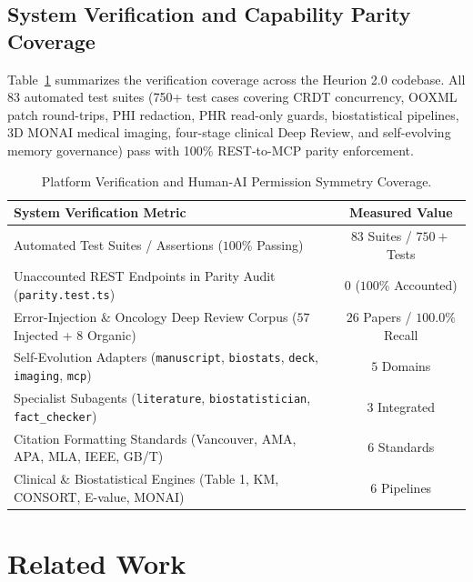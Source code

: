 \documentclass[11pt,a4paper]{article}
\begin{document}
\subsection{System Verification and Capability Parity Coverage}
Table~\ref{tab:system_verification} summarizes the verification coverage across the Heurion 2.0 codebase. All 83 automated test suites (750+ test cases covering CRDT concurrency, OOXML patch round-trips, PHI redaction, PHR read-only guards, biostatistical pipelines, 3D MONAI medical imaging, four-stage clinical Deep Review, and self-evolving memory governance) pass with 100\% REST-to-MCP parity enforcement.

\begin{table}[!t]
\centering
\caption{Platform Verification and Human-AI Permission Symmetry Coverage.}
\label{tab:system_verification}
\vspace{2pt}
\small
\setlength{\tabcolsep}{0pt}
\begin{tabular*}{\textwidth}{@{\extracolsep{\fill}}lc@{}}
\toprule
\textbf{System Verification Metric} & \textbf{Measured Value} \\
\midrule
Automated Test Suites / Assertions ($100\%$ Passing) & $83$ Suites / $750+$ Tests \\
Unaccounted REST Endpoints in Parity Audit (\texttt{parity.test.ts}) & $0$ ($100\%$ Accounted) \\
Error-Injection \& Oncology Deep Review Corpus ($57$ Injected + $8$ Organic) & $26$ Papers / $100.0\%$ Recall \\
Self-Evolution Adapters (\texttt{manuscript}, \texttt{biostats}, \texttt{deck}, \texttt{imaging}, \texttt{mcp}) & $5$ Domains \\
Specialist Subagents (\texttt{literature}, \texttt{biostatistician}, \texttt{fact\_checker}) & $3$ Integrated \\
Citation Formatting Standards (Vancouver, AMA, APA, MLA, IEEE, GB/T) & $6$ Standards \\
Clinical \& Biostatistical Engines (Table 1, KM, CONSORT, E-value, MONAI) & $6$ Pipelines \\
\bottomrule
\end{tabular*}
\end{table}

\section{Related Work}
\label{sec:related}
\end{document}
